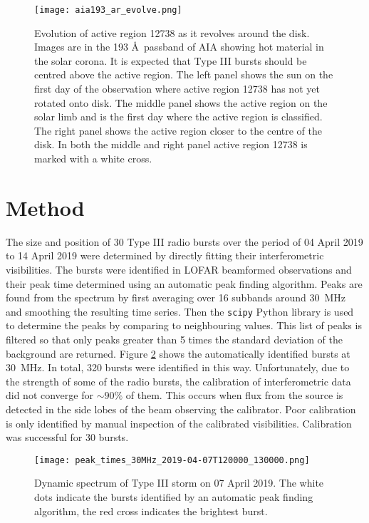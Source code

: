 \begin{figure}[ht]
\centering
\texttt{[image: aia193\_ar\_evolve.png]}
\caption[Evolution of active region 12738 as it revolves around the disk.]{Evolution of active region 12738 as it revolves around the disk. Images are in the 193 \AA \ passband of AIA showing hot material in the solar corona. It is expected that Type III bursts should be centred above the active region. The left panel shows the sun on the first day of the observation where active region 12738 has not yet rotated onto disk. The middle panel shows the active region on the solar limb and is the first day where the active region is classified. The right panel shows the active region closer to the centre of the disk. In both the middle and right panel active region 12738 is marked with a white cross.}
\label{fig:ar_evolve}
\end{figure}

\section{Method}
\label{sec:obsvtheory_method}
The size and position of 30 Type III radio bursts over the period of 04 April 2019 to 14 April 2019 were determined by directly fitting their interferometric visibilities. The bursts were identified in LOFAR beamformed observations and their peak time determined using an automatic peak finding algorithm. Peaks are found from the spectrum by first averaging over 16 subbands around 30~MHz and smoothing the resulting time series. Then the \texttt{scipy} Python library \citep{Virtanen2020} is used to determine the peaks by comparing to neighbouring values. This list of peaks is filtered so that only peaks greater than 5 times the standard deviation of the background are returned.
Figure \ref{fig:dynamic_spectrum_070419} shows the automatically identified bursts at 30~MHz. In total, 320 bursts were identified in this way. Unfortunately, due to the strength of some of the radio bursts, the calibration of interferometric data did not converge for $\sim 90 \%$ of them. This occurs when flux from the source is detected in the side lobes of the beam observing the calibrator. Poor calibration is only identified by manual inspection of the calibrated visibilities. Calibration was successful for 30 bursts.  

\begin{figure}[ht]
\centering
\texttt{[image: peak\_times\_30MHz\_2019-04-07T120000\_130000.png]}
\caption[Dynamic spectrum of Type III storm on 07 April 2019.]{Dynamic spectrum of Type III storm on 07 April 2019. The white dots indicate the bursts identified by an automatic peak finding algorithm, the red cross indicates the brightest burst.}
\label{fig:dynamic_spectrum_070419}
\end{figure}

